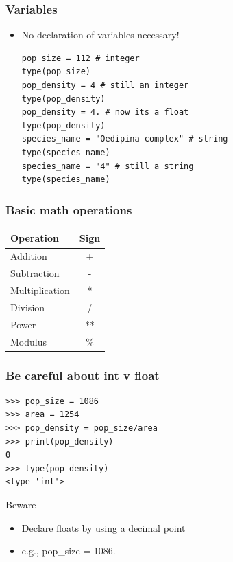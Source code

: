 \documentclass{beamer}
\begin{document}
\begin{frame}[fragile]
\frametitle{Variables}
\begin{itemize}
\item No declaration of variables necessary!
\begin{lstlisting}
pop_size = 112 # integer
type(pop_size)
pop_density = 4 # still an integer
type(pop_density)
pop_density = 4. # now its a float
type(pop_density)
species_name = "Oedipina complex" # string
type(species_name)
species_name = "4" # still a string
type(species_name)
\end{lstlisting}
\end{itemize}
\end{frame}

\begin{frame}[fragile]
\frametitle{Basic math operations}
\begin{center}
\begin{tabular}{lc} \hline
\rowcolor{UniBlue!100}Operation & Sign \\ \hline \hline
\rowcolor{UniBlue!75}Addition & + \\ \hline
\rowcolor{UniBlue!90}Subtraction & - \\ \hline
\rowcolor{UniBlue!75}Multiplication & * \\ \hline
\rowcolor{UniBlue!90}Division & / \\ \hline
\rowcolor{UniBlue!75}Power & ** \\ \hline
\rowcolor{UniBlue!90}Modulus & \% \\ \hline
\end{tabular}
\end{center}


\end{frame}

\begin{frame}[fragile]
\frametitle{Be careful about int v float}
\begin{lstlisting}
>>> pop_size = 1086
>>> area = 1254
>>> pop_density = pop_size/area
>>> print(pop_density)
0
>>> type(pop_density)
<type 'int'>
\end{lstlisting}
\begin{alertblock}{Beware}
\begin{itemize}
\item Declare floats by using a decimal point
\item e.g., pop\_size = 1086.
\end{itemize}
\end{alertblock}
\end{frame}
\end{document}
